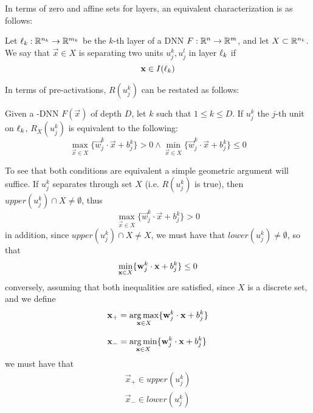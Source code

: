 In terms of zero and affine sets for layers, an equivalent characterization is as follows:
\begin{remark}
Let $\layer_k:\Real{n_k}\rightarrow\Real{m_k}$ be the $k$-th layer of a \ReLU DNN $F:\Real{n}\rightarrow\Real{m}$, and let $X\subset\Real{n_k}$. We say that $\vec{x}\in X$ is separating two units $u_j^k,u_j^l$ in layer $\layer_k$ if 
\begin{equation}
    \vec{x}\in I(\layer_k)
\end{equation}
\end{remark}
In terms of pre-activations, $R(u_j^k)$ can be restated as follows:
\begin{remark}\label{rmk:separationUsingGeometry}
Given a \ReLU-DNN $F(\vec{x})$ of depth $D$, let $k$ such that $1\leq k \leq D$. If $u_j^k$ the $j$-th unit on $\layer_k$, $R_X(u_j^k)$ is equivalent to the following:
\begin{equation}\label{eq:preactivationCharacterization}
\displaystyle\max_{\vec{x}\in X}\{\vec{w}_j^k\cdot\vec{x}+b_j^k\} > 0
\wedge 
\displaystyle\min_{\vec{x}\in X}\{\vec{w}_j^k\cdot\vec{x}+b_j^k\} \leq 0
\end{equation}
\end{remark}
To see that both conditions are equivalent a simple geometric argument will suffice. If $u_j^k$ separates through set $X$ (i.e. $R(u_j^k)$ is true), then $upper(u_j^k)\cap X\neq\emptyset$, thus 
\begin{equation}
    \max_{\vec{x}\in X}\{\vec{w}_j^k\cdot\vec{x}+b_j^k\} > 0
\end{equation}
in addition, since $upper(u_j^k)\cap X\neq X$, we must have that $lower(u_j^k)\neq \emptyset$, so that 
\begin{equation}
 \displaystyle\min_{\vec{x}\in X}\{\vec{w}_j^k\cdot\vec{x}+b_j^k\} \leq 0\\     
\end{equation}
conversely, assuming that both inequalities are satisfied, since $X$ is a discrete set, and we define 
\begin{equation}
\begin{array}{l}
    \vec{x}_{+} = \displaystyle\argmax_{\vec{x}\in X}\{\vec{w}_j^k\cdot\vec{x}+b_j^k\}\\\\
    \vec{x}_{-} = \displaystyle\argmin_{\vec{x}\in X}\{\vec{w}_j^k\cdot\vec{x}+b_j^k\}\\
\end{array}
\end{equation}
we must have that 
\begin{equation}
\begin{array}{l}
 \vec{x}_{+}\in upper(u_j^k)\\
 \vec{x}_{-}\in lower(u_j^k)\\
 \end{array}
\end{equation} 

